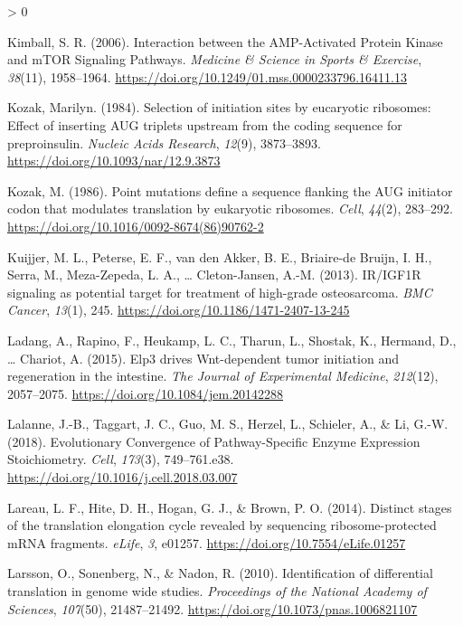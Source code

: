\documentclass[
  12pt,
  openany]{book}
\newlength{\cslhangindent}
\newenvironment{CSLReferences}[2] %
 {%
  \setlength{\parindent}{0pt}
  \ifodd #1 \everypar{\setlength{\hangindent}{\cslhangindent}}\ignorespaces\fi
  \ifnum #2 > 0
  \setlength{\parskip}{#2\baselineskip}
  \fi
 }%
 {}
\begin{document}
\begin{CSLReferences}{1}{0}
\leavevmode\hypertarget{ref-Kimball2006}{}%
Kimball, S. R. (2006). Interaction between the {AMP}-{Activated Protein Kinase} and {mTOR Signaling Pathways}. \emph{Medicine \& Science in Sports \& Exercise}, \emph{38}(11), 1958--1964. \url{https://doi.org/10.1249/01.mss.0000233796.16411.13}

\leavevmode\hypertarget{ref-Kozak1984}{}%
Kozak, Marilyn. (1984). Selection of initiation sites by eucaryotic ribosomes: Effect of inserting {AUG} triplets upstream from the coding sequence for preproinsulin. \emph{Nucleic Acids Research}, \emph{12}(9), 3873--3893. \url{https://doi.org/10.1093/nar/12.9.3873}

\leavevmode\hypertarget{ref-Kozak1986}{}%
Kozak, M. (1986). Point mutations define a sequence flanking the {AUG} initiator codon that modulates translation by eukaryotic ribosomes. \emph{Cell}, \emph{44}(2), 283--292. \url{https://doi.org/10.1016/0092-8674(86)90762-2}

\leavevmode\hypertarget{ref-Kuijjer2013}{}%
Kuijjer, M. L., Peterse, E. F., van den Akker, B. E., Briaire-de Bruijn, I. H., Serra, M., Meza-Zepeda, L. A., \ldots{} Cleton-Jansen, A.-M. (2013). {IR}/{IGF1R} signaling as potential target for treatment of high-grade osteosarcoma. \emph{BMC Cancer}, \emph{13}(1), 245. \url{https://doi.org/10.1186/1471-2407-13-245}

\leavevmode\hypertarget{ref-Ladang2015}{}%
Ladang, A., Rapino, F., Heukamp, L. C., Tharun, L., Shostak, K., Hermand, D., \ldots{} Chariot, A. (2015). Elp3 drives {Wnt}-dependent tumor initiation and regeneration in the intestine. \emph{The Journal of Experimental Medicine}, \emph{212}(12), 2057--2075. \url{https://doi.org/10.1084/jem.20142288}

\leavevmode\hypertarget{ref-Lalanne2018}{}%
Lalanne, J.-B., Taggart, J. C., Guo, M. S., Herzel, L., Schieler, A., \& Li, G.-W. (2018). Evolutionary {Convergence} of {Pathway}-{Specific Enzyme Expression Stoichiometry}. \emph{Cell}, \emph{173}(3), 749--761.e38. \url{https://doi.org/10.1016/j.cell.2018.03.007}

\leavevmode\hypertarget{ref-Lareau2014}{}%
Lareau, L. F., Hite, D. H., Hogan, G. J., \& Brown, P. O. (2014). Distinct stages of the translation elongation cycle revealed by sequencing ribosome-protected {mRNA} fragments. \emph{eLife}, \emph{3}, e01257. \url{https://doi.org/10.7554/eLife.01257}

\leavevmode\hypertarget{ref-Larsson2010}{}%
Larsson, O., Sonenberg, N., \& Nadon, R. (2010). Identification of differential translation in genome wide studies. \emph{Proceedings of the National Academy of Sciences}, \emph{107}(50), 21487--21492. \url{https://doi.org/10.1073/pnas.1006821107}


\end{CSLReferences}
\end{document}
